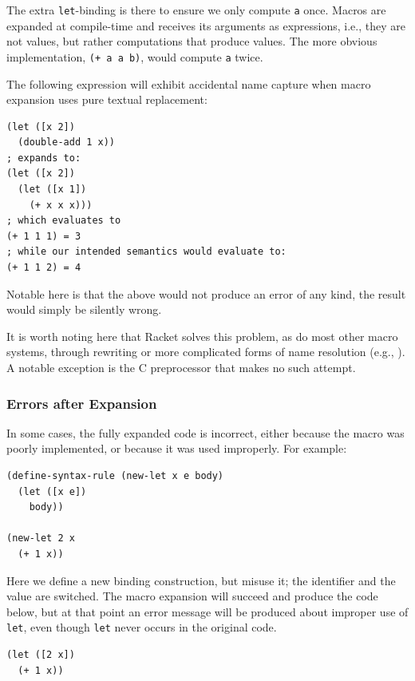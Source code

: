 \documentclass{kththesis}
\begin{document}
The extra \texttt{let}-binding is there to ensure we only compute \texttt{a} once. Macros are expanded at compile-time and receives its arguments as expressions, i.e., they are not values, but rather computations that produce values. The more obvious implementation, \texttt{(+ a a b)}, would
compute \texttt{a} twice.

The following expression will exhibit accidental name capture when macro expansion uses pure textual replacement:

\begin{verbatim}
(let ([x 2])
  (double-add 1 x))
; expands to:
(let ([x 2])
  (let ([x 1])
    (+ x x x)))
; which evaluates to
(+ 1 1 1) = 3
; while our intended semantics would evaluate to:
(+ 1 1 2) = 4
\end{verbatim}

Notable here is that the above would not produce an error of any kind, the result would simply be silently wrong.

It is worth noting here that Racket solves this problem, as do most other macro systems, through rewriting or more complicated forms of name resolution (e.g., \cite{FLATT2012Macros-that-Wor,Flatt2016Binding-As-Sets}). A notable exception is the C preprocessor that makes no such attempt.

\subsubsection{Errors after Expansion}

In some cases, the fully expanded code is incorrect, either because the macro was poorly implemented, or because it was used improperly. For example:

\begin{verbatim}
(define-syntax-rule (new-let x e body)
  (let ([x e])
    body))

(new-let 2 x
  (+ 1 x))
\end{verbatim}

Here we define a new binding construction, but misuse it; the identifier and the value are switched. The macro expansion will succeed and produce the code below, but at that point an error message will be produced about improper use of \texttt{let}, even though \texttt{let} never occurs in the original code.

\begin{verbatim}
(let ([2 x])
  (+ 1 x))
\end{verbatim}
\end{document}
